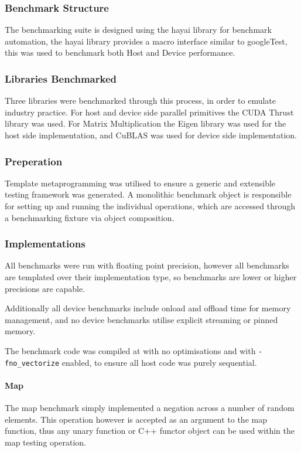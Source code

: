 \subsubsection{Benchmark Structure}
The benchmarking suite is designed using the hayai\cite{hayai} library for benchmark automation,
the hayai library provides a macro interface similar to googleTest, this was used to benchmark both
Host and Device performance.

\subsubsection{Libraries Benchmarked}
Three libraries were benchmarked through this process, in order to emulate industry practice. For
host and device side parallel primitives the CUDA Thrust\cite{thrust} library was used. For Matrix
Multiplication the Eigen\cite{eigen} library was used for the host side implementation, and
CuBLAS\cite{cublas} was used for device side implementation.

\subsubsection{Preperation}
Template metaprogramming was utilised to ensure a generic and extensible testing framework was
generated. A monolithic benchmark object is responsible for setting up and running the individual
operations, which are accessed through a benchmarking fixture via object composition.

\subsubsection{Implementations}
All benchmarks were run with floating point precision, however all benchmarks are templated over
their implementation type, so benchmarks are lower or higher precisions are capable.

Additionally all device benchmarks include onload and offload time for memory management, and no
device benchmarks utilise explicit streaming or pinned memory.

The benchmark code was compiled at with no optimisations and with \lstinline{-fno_vectorize} enabled, to ensure
all host code was purely sequential.
\paragraph{Map}
The map benchmark simply implemented a negation across a number of random elements. This operation
however is accepted as an argument to the map function, thus any unary function or C++ functor
object can be used within the map testing operation.

